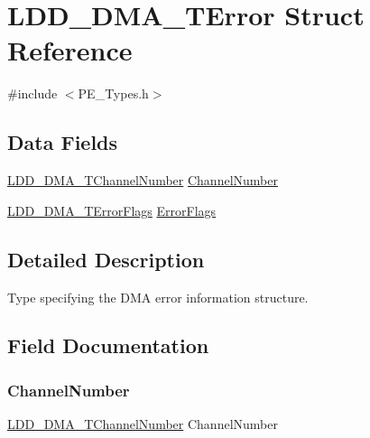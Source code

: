 \hypertarget{struct_l_d_d___d_m_a___t_error}{}\section{L\+D\+D\+\_\+\+D\+M\+A\+\_\+\+T\+Error Struct Reference}
\label{struct_l_d_d___d_m_a___t_error}


{\ttfamily \#include $<$P\+E\+\_\+\+Types.\+h$>$}

\subsection*{Data Fields}
\begin{DoxyCompactItemize}
\item 
\hyperlink{group___p_e___types__module_gad268d607015891269cb015faa8bc0dac}{L\+D\+D\+\_\+\+D\+M\+A\+\_\+\+T\+Channel\+Number} \hyperlink{struct_l_d_d___d_m_a___t_error_a203b693a350df7170042dd0c18ffd6bb}{Channel\+Number}
\item 
\hyperlink{group___p_e___types__module_gaea6d9250a094d0f060ae12a0b7abb474}{L\+D\+D\+\_\+\+D\+M\+A\+\_\+\+T\+Error\+Flags} \hyperlink{struct_l_d_d___d_m_a___t_error_ac719f5f56edcf8607505829469fa6eb1}{Error\+Flags}
\end{DoxyCompactItemize}


\subsection{Detailed Description}
Type specifying the D\+MA error information structure. 

\subsection{Field Documentation}
\mbox{\label{struct_l_d_d___d_m_a___t_error_a203b693a350df7170042dd0c18ffd6bb}} 
\subsubsection{\texorpdfstring{Channel\+Number}{ChannelNumber}}
{\footnotesize\ttfamily \hyperlink{group___p_e___types__module_gad268d607015891269cb015faa8bc0dac}{L\+D\+D\+\_\+\+D\+M\+A\+\_\+\+T\+Channel\+Number} Channel\+Number}

